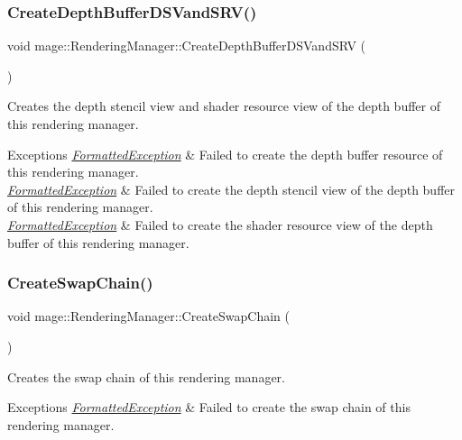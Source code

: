 \subsubsection{\texorpdfstring{Create\+Depth\+Buffer\+D\+S\+Vand\+S\+R\+V()}{CreateDepthBufferDSVandSRV()}}
{\footnotesize\ttfamily void mage\+::\+Rendering\+Manager\+::\+Create\+Depth\+Buffer\+D\+S\+Vand\+S\+RV (\begin{DoxyParamCaption}{ }\end{DoxyParamCaption})\hspace{0.3cm}{\ttfamily [private]}}

Creates the depth stencil view and shader resource view of the depth buffer of this rendering manager.


\begin{DoxyExceptions}{Exceptions}
{\em \hyperlink{structmage_1_1_formatted_exception}{Formatted\+Exception}} & Failed to create the depth buffer resource of this rendering manager. \\
\hline
{\em \hyperlink{structmage_1_1_formatted_exception}{Formatted\+Exception}} & Failed to create the depth stencil view of the depth buffer of this rendering manager. \\
\hline
{\em \hyperlink{structmage_1_1_formatted_exception}{Formatted\+Exception}} & Failed to create the shader resource view of the depth buffer of this rendering manager. \\
\hline
\end{DoxyExceptions}
\hypertarget{classmage_1_1_rendering_manager_a879f65b1c2b283edd2ad89606e174a02}{}\label{classmage_1_1_rendering_manager_a879f65b1c2b283edd2ad89606e174a02} 
\subsubsection{\texorpdfstring{Create\+Swap\+Chain()}{CreateSwapChain()}}
{\footnotesize\ttfamily void mage\+::\+Rendering\+Manager\+::\+Create\+Swap\+Chain (\begin{DoxyParamCaption}{ }\end{DoxyParamCaption})\hspace{0.3cm}{\ttfamily [private]}}

Creates the swap chain of this rendering manager.


\begin{DoxyExceptions}{Exceptions}
{\em \hyperlink{structmage_1_1_formatted_exception}{Formatted\+Exception}} & Failed to create the swap chain of this rendering manager. \\
\hline
\end{DoxyExceptions}
\hypertarget{classmage_1_1_rendering_manager_a8ff0d99310ead5217f7516d61871430a}{}\label{classmage_1_1_rendering_manager_a8ff0d99310ead5217f7516d61871430a} 
